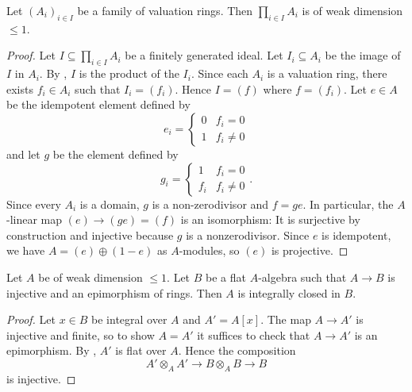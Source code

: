 \begin{lemma}[\stacksproject{092T}]
    Let $(A_i)_{i \in I}$ be a family of valuation rings. Then
    $\prod_{i \in I} A_i$ is of weak dimension $\le 1$.
    \label{lemma:prod-valuation-ring-weak-dim-integrally-closed}
    \leanok
\end{lemma}

\begin{proof}
    \leanok
    Let $I \subseteq \prod_{i \in I} A_i$ be a finitely generated ideal. Let $I_i \subseteq A_i$
    be the image of $I$ in $A_i$.
    By , $I$ is the product of the $I_i$.
    Since each $A_i$ is a valuation ring, there exists $f_i \in A_i$ such
    that $I_i = (f_i)$. Hence $I = (f)$ where $f = (f_i)$. Let $e \in A$
    be the idempotent element defined by
    \[
    e_i = \begin{cases}
        0 & f_i = 0 \\
        1 & f_i \neq 0
    \end{cases}
    \] and let $g$ be the element defined by
    \[
    g_i = \begin{cases}
        1 & f_i = 0 \\
        f_i & f_i \neq 0
    \end{cases}
    .\] Since every $A_i$ is a domain, $g$ is a non-zerodivisor and $f = g e$. In particular,
    the $A$-linear map $(e) \to (ge) = (f)$ is an isomorphism: It is surjective by construction
    and injective because $g$ is a nonzerodivisor. Since $e$ is idempotent,
    we have $A = (e) \oplus (1 - e)$ as $A$-modules, so $(e)$ is projective.
\end{proof}

\begin{lemma}[\stacksproject{092V}]
    Let $A$ be of weak dimension $\le 1$. Let $B$ be a
    flat $A$-algebra such that $A \to B$ is injective and an epimorphism of rings. Then
    $A$ is integrally closed in $B$.
    \label{lemma:weak-dim-integrally-closed}
    \leanok
\end{lemma}

\begin{proof}
    \leanok
    Let $x \in B$ be integral over $A$ and $A' = A[x]$. The map $A \to A'$ is injective and finite, so
    to show $A = A'$ it suffices to check that $A \to A'$ is an epimorphism. By
    , $A'$ is flat over $A$. Hence
    the composition
    \[
        A' \otimes_{A} A' \to B \otimes_{A} B \to B
    \] is injective.
\end{proof}

